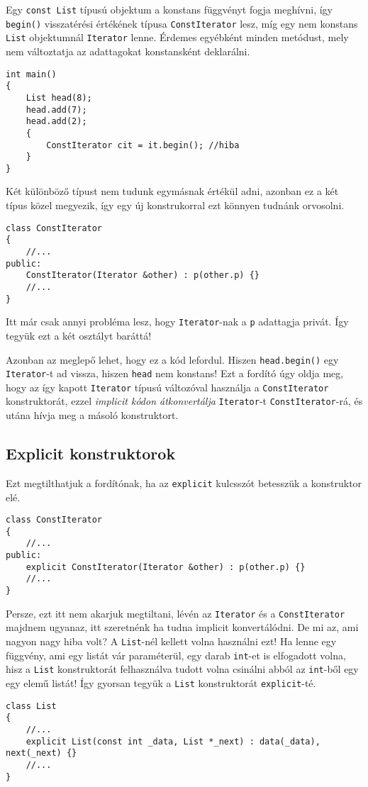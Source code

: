\documentclass[a4paper,11.5pt,table]{article}
\begin{document}
	Egy \texttt{const List} típusú objektum a konstans függvényt fogja meghívni, így \texttt{begin()} visszatérési értékének típusa \texttt{ConstIterator} lesz, míg egy nem konstans \texttt{List} objektumnál \texttt{Iterator} lenne. Érdemes egyébként minden metódust, mely nem változtatja az adattagokat konstansként deklarálni. 
	\begin{lstlisting}
int main()
{
	List head(8);
	head.add(7);
	head.add(2);
	{
		ConstIterator cit = it.begin(); //hiba
	}
}
	\end{lstlisting}
	Két különböző típust nem tudunk egymásnak értékül adni, azonban ez a két típus közel megyezik, így egy új konstrukorral ezt könnyen tudnánk orvosolni.
	\begin{lstlisting}
class ConstIterator
{
	//...
public:
	ConstIterator(Iterator &other) : p(other.p) {}
	//...
}
	\end{lstlisting}
	Itt már csak annyi probléma lesz, hogy \texttt{Iterator}-nak a \texttt{p} adattagja privát. Így tegyük ezt a két osztályt baráttá!
	
	Azonban az meglepő lehet, hogy ez a kód lefordul. Hiszen \texttt{head.begin()} egy \texttt{Iterator}-t ad vissza, hiszen \texttt{head} nem konstans! Ezt a fordító úgy oldja meg, hogy az így kapott \texttt{Iterator} típusú változóval használja a \texttt{ConstIterator} konstruktorát, ezzel \textit{implicit kódon átkonvertálja} \texttt{Iterator}-t \texttt{ConstIterator}-rá, és utána hívja meg a másoló konstruktort. 
	
	\subsection{Explicit konstruktorok}
	Ezt megtilthatjuk a fordítónak, ha az \texttt{explicit} kulcsszót betesszük a konstruktor elé.
	
\begin{lstlisting}
class ConstIterator
{
	//...
public:
	explicit ConstIterator(Iterator &other) : p(other.p) {}
	//...
}
\end{lstlisting}
	Persze, ezt itt nem akarjuk megtiltani, lévén az \texttt{Iterator} és a \texttt{ConstIterator} majdnem ugyanaz, itt szeretnénk ha tudna implicit konvertálódni. De mi az, ami nagyon nagy hiba volt? A \texttt{List}-nél kellett volna használni ezt! Ha lenne egy függvény, ami egy listát vár paraméterül, egy darab \texttt{int}-et is elfogadott volna, hisz a \texttt{List} konstruktorát felhasználva tudott volna csinálni abból az \texttt{int}-ből egy egy elemű listát! Így gyorsan tegyük a \texttt{List} konstruktorát \texttt{explicit}-té.
	\begin{lstlisting}
class List
{
	//...
	explicit List(const int _data, List *_next) : data(_data), next(_next) {}
	//...
}
	\end{lstlisting}
\end{document}
